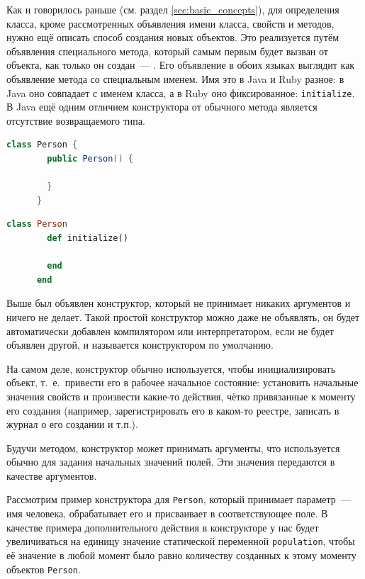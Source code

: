 \documentclass[a4paper, 14pt, titlepage]{extarticle}
\newcommand{\define}[1]{\uwave{#1}}
\newcommand{\ie}{т.~е.~}
\newenvironment{halfpage}%
    {\noindent\begin{minipage}[h]{0.49\linewidth}} %
    {\end{minipage}\hfill}
\newcommand{\inlinecode}[2][Java]{\lstinline[basicstyle=\ttfamily, language=#1]{#2}}
\begin{document}
  Как и говорилось раньше (см. раздел \ref{sec:basic_concepts}), для определения класса, кроме
  рассмотренных объявления имени класса, свойств и методов, нужно ещё описать способ создания новых
  объектов. Это реализуется путём объявления специального метода, который самым первым будет вызван
  от объекта, как только он создан~--- \define{конструктора}. Его объявление в обоих языках выглядит
  как объявление метода со специальным именем. Имя это в Java и Ruby разное: в Java оно совпадает с
  именем класса, а в Ruby оно фиксированное: \inlinecode[Ruby]{initialize}. В Java ещё одним
  отличием конструктора от обычного метода является отсутствие возвращаемого типа.

  \begin{halfpage}
    \begin{lstlisting}[language=Java, title={Трививальный конструктор в Java}, gobble=6, texcl]
      class Person {
        public Person() {

        }
      }
    \end{lstlisting}
  \end{halfpage}
  \begin{halfpage}
    \begin{lstlisting}[language=Ruby, title={Тривиальный конструктор в Ruby}, gobble=6, texcl]
      class Person
        def initialize()

        end
      end
    \end{lstlisting}
  \end{halfpage}

  Выше был объявлен конструктор, который не принимает никаких аргументов и ничего не делает. Такой
  простой конструктор можно даже не объявлять, он будет автоматически добавлен компилятором или
  интерпретатором, если не будет объявлен другой, и называется конструктором по умолчанию.

  На самом деле, конструктор обычно используется, чтобы инициализировать объект, \ie привести его в
  рабочее начальное состояние: установить начальные значения свойств и произвести какие-то действия,
  чётко привязанные к моменту его создания (например, зарегистрировать его в каком-то реестре,
  записать в журнал о его создании и т.п.).

  Будучи методом, конструктор может принимать аргументы, что используется обычно для задания
  начальных значений полей. Эти значения передаются в качестве аргументов.

  Рассмотрим пример конструктора для \inlinecode{Person}, который принимает параметр~--- имя
  человека, обрабатывает его и присваивает в соответствующее поле. В качестве примера
  дополнительного действия в конструкторе у нас будет увеличиваться на единицу значение статической
  переменной \inlinecode{population}, чтобы её значение в любой момент было равно количеству
  созданных к этому моменту объектов \inlinecode{Person}.
\end{document}
